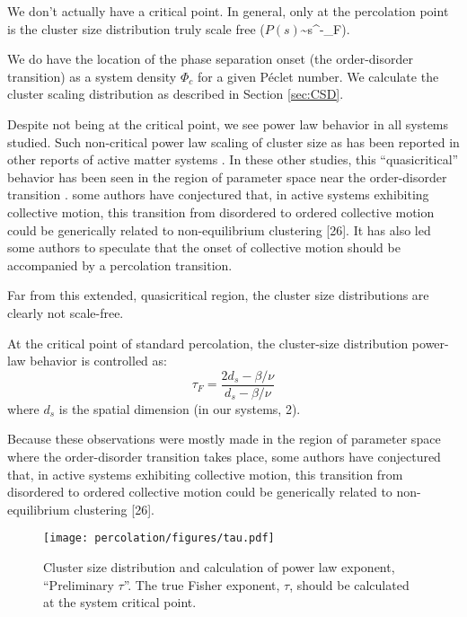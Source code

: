 We don't actually have a critical point.
In general, only at the percolation point is the cluster size distribution truly scale free ($P(s)$\sim{s}^{-\tau_F}).

We do have the location of the phase separation onset (the order-disorder transition) as a system density $\Phi_c$ for a given P\'{e}clet number.
We calculate the cluster scaling distribution as described in Section \ref{sec:CSD}.

Despite not being at the critical point, we see power law behavior in all systems studied.
Such non-critical power law scaling of cluster size as has been reported in other reports of active matter systems \cite{[10,24,25]}.
In these other studies, this ``quasicritical'' behavior has been seen in the region of parameter space near the order-disorder transition \cite{[26]}.
some authors have conjectured that, in active systems exhibiting collective motion, this transition from disordered to ordered collective motion could be generically related to non-equilibrium clustering [26].
It has also led some authors to speculate that the onset of collective motion should be accompanied by a percolation transition. \cite{Flock_percolation_2019}

Far from this extended, quasicritical region, the cluster size distributions are clearly not scale-free. \cite{Flock_percolation_2019}

At the critical point of standard percolation, the cluster-size distribution power-law behavior is controlled as:
\begin{equation}
\tau_F = \frac{2d_s-\beta/\nu}{d_s-\beta/\nu}
\end{equation}
where $d_s$ is the spatial dimension (in our systems, 2).

Because these observations were mostly made in the region of parameter space where the order-disorder transition takes place, some authors have conjectured that, in active systems exhibiting collective motion, this transition from disordered to ordered collective motion could be generically related to non-equilibrium clustering [26]. \cite{Flock_percolation_2019}

\begin{figure}[t]
\begin{center}
\texttt{[image: percolation/figures/tau.pdf]}
\caption{Cluster size distribution and calculation of power law exponent, ``Preliminary $\tau$''.
The true Fisher exponent, $\tau$, should be calculated at the system critical point.
}
\label{fig:cluster_formation}
\end{center}
\end{figure}

